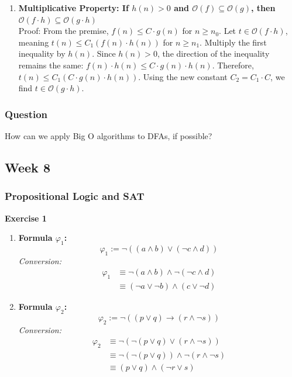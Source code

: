 \documentclass{article}
\theoremstyle{theorem}
\theoremstyle{definition}
\theoremstyle{remark}
\begin{document}
\begin{enumerate}
    \item \textbf{Multiplicative Property: If $h(n) > 0$ and $\mathcal{O}(f) \subseteq \mathcal{O}(g)$, then $\mathcal{O}(f \cdot h) \subseteq \mathcal{O}(g \cdot h)$} \\
    Proof: From the premise, $f(n) \leq C \cdot g(n)$ for $n \geq n_0$. 
    Let $t \in \mathcal{O}(f \cdot h)$, meaning $t(n) \leq C_1(f(n) \cdot h(n))$ for $n \geq n_1$. 
    Multiply the first inequality by $h(n)$. Since $h(n) > 0$, the direction of the inequality remains the same: $f(n) \cdot h(n) \leq C \cdot g(n) \cdot h(n)$. 
    Therefore, $t(n) \leq C_1(C \cdot g(n) \cdot h(n))$. 
    Using the new constant $C_2 = C_1 \cdot C$, we find $t \in \mathcal{O}(g \cdot h)$.
\end{enumerate}

\subsubsection{Question}
How can we apply Big O algorithms to DFAs, if possible?

\subsection{Week 8}

\subsubsection{Propositional Logic and SAT} 

\textbf{Exercise 1}
\begin{enumerate}
    \item \textbf{Formula $\varphi_1$:}
    \[ \varphi_1 := \neg((a \wedge b) \vee (\neg c \wedge d)) \]
    \textit{Conversion:}
    \begin{align*}
        \varphi_1 &\equiv \neg(a \wedge b) \wedge \neg(\neg c \wedge d) \tag{De Morgan's} \\
        &\equiv (\neg a \vee \neg b) \wedge (c \vee \neg d) \tag{CNF Result}
    \end{align*}

    \item \textbf{Formula $\varphi_2$:}
    \[ \varphi_2 := \neg((p \vee q) \rightarrow (r \wedge \neg s)) \]
    \textit{Conversion:}
    \begin{align*}
        \varphi_2 &\equiv \neg(\neg(p \vee q) \vee (r \wedge \neg s)) \tag{Implication Rule} \\
        &\equiv \neg(\neg(p \vee q)) \wedge \neg(r \wedge \neg s) \tag{De Morgan's} \\
        &\equiv (p \vee q) \wedge (\neg r \vee s) \tag{CNF Result}
    \end{align*}
\end{enumerate}
\end{document}
